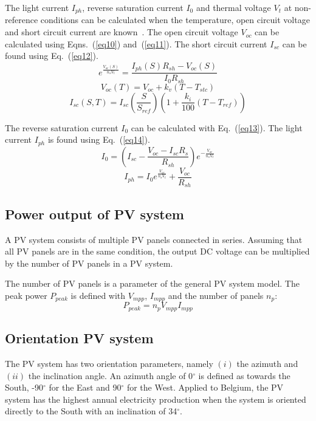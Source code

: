 The light current $I_{ph}$, reverse saturation current $I_{0}$ and thermal voltage $V_{t}$ at non-reference conditions can be calculated when the temperature, open circuit voltage and short circuit current are known~\cite{sera}. The open circuit voltage $V_{oc}$ can be calculated using Eqns.~(\ref{eq10}) and~(\ref{eq11}). The short circuit current $I_{sc}$ can be found using Eq.~(\ref{eq12}).
\begin{equation}
e^{\frac{V_{oc}(S)}{n_{s} V_{t}}} = \frac{I_{ph}(S) R_{sh} - V_{oc}(S)}{I_{0} {R_{sh}}}
\label{eq10}
\end{equation}
\begin{equation}
V_{oc}(T) = V_{oc} + k_{v} (T - T_{stc})
\label{eq11}
\end{equation}
\begin{equation}
I_{sc}(S,T) = I_{sc} \left(\frac{S}{S_{ref}} \right) \left(1 + \frac{k_{i}}{100} (T - T_{ref}) \right)
\label{eq12}
\end{equation}

The reverse saturation current $I_{0}$ can be calculated with Eq.~(\ref{eq13}). The light current $I_{ph}$ is found using Eq.~(\ref{eq14}).
\begin{equation}
I_{0} = \left(I_{sc} - \frac{V_{oc} - I_{sc} R_{s}}{R_{sh}} \right) e^{-\frac{V_{oc}}{n_{s} V_{t}}}    
\label{eq13}
\end{equation}
\begin{equation}
I_{ph} = I_{0} e^{\frac{V_{oc}}{n_{s} V_{t}}} + \frac{V_{oc}}{R_{sh}}
\label{eq14}
\end{equation}

\subsection{Power output of PV system}
A PV system consists of multiple PV panels connected in series. Assuming that all PV panels are in the same condition, the output DC voltage can be multiplied by the number of PV panels in a PV system.

The number of PV panels is a parameter of the general PV system model. The peak power $P_{peak}$ is defined with $V_{mpp}$, $I_{mpp}$ and the number of panels $n_p$:
\begin{equation}
P_{peak} = n_p V_{mpp} I_{mpp}
\label{Ppeak}
\end{equation}

\subsection{Orientation PV system}
The PV system has two orientation parameters, namely $(i)$ the azimuth and $(ii)$ the inclination angle. An azimuth angle of 0$^\circ$ is defined as towards the South, -90$^\circ$ for the East and 90$^\circ$ for the West. Applied to Belgium, the PV system has the highest annual electricity production when the system is oriented directly to the South with an inclination of 34$^\circ$.


